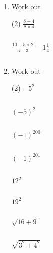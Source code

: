 \begin{enumerate} [leftmargin=0cm]
\item Work out
\begin{tasks}[label=(\alph*), after-item-skip=2pt,after-skip=3pt, label-width=4ex](2)
    \task  $ \frac{8+4}{8 \times 4}                              $                  \\  \begin{envAnswer}[blankline=3]        $       $ \end{envAnswer}
    \task  $ \frac{10+5 \times 2}{5 \div 3} - 1 \frac{1}{4}      $                  \\  \begin{envAnswer}[blankline=3]        $       $ \end{envAnswer}
\end{tasks}

\item Work out
\begin{tasks}[label=(\alph*), after-item-skip=2pt,after-skip=3pt, label-width=4ex](2)
    \task  $ -5^2                                                $                  \\  \begin{envAnswer}[blankline=2]        $       $ \end{envAnswer}
    \task  $ (-5)^2                                              $                  \\  \begin{envAnswer}[blankline=2]        $       $ \end{envAnswer}
    \task  $ (-1)^{200}                                          $                  \\  \begin{envAnswer}[blankline=2]        $       $ \end{envAnswer}
    \task  $ (-1)^{201}                                          $                  \\  \begin{envAnswer}[blankline=2]        $       $ \end{envAnswer}
    \task  $ 12^2                                                $                  \\  \begin{envAnswer}[blankline=2]        $       $ \end{envAnswer}
    \task  $ 19^2                                                $                  \\  \begin{envAnswer}[blankline=2]        $       $ \end{envAnswer}
    \task  $ \sqrt{16+9}                                         $                  \\  \begin{envAnswer}[blankline=2]        $       $ \end{envAnswer}
    \task  $ \sqrt{3^2 + 4^2}                                    $                  \\  \begin{envAnswer}[blankline=2]        $       $ \end{envAnswer}
\end{tasks}



\end{enumerate}
